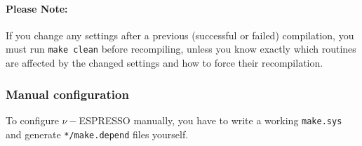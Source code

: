 \documentclass[12pt,a4paper]{article}
\begin{document}
\paragraph{Please Note:}

If you change any settings after a previous (successful or failed)
compilation, you must run \texttt{make clean} before recompiling,
unless you know exactly which routines are affected by the changed
settings and how to force their recompilation.

\subsubsection{Manual configuration}
  \label{manualconf}

To configure $\nu-$ESPRESSO manually, you have to write a working
\texttt{make.sys} and generate \texttt{*/make.depend} files yourself.
\end{document}
